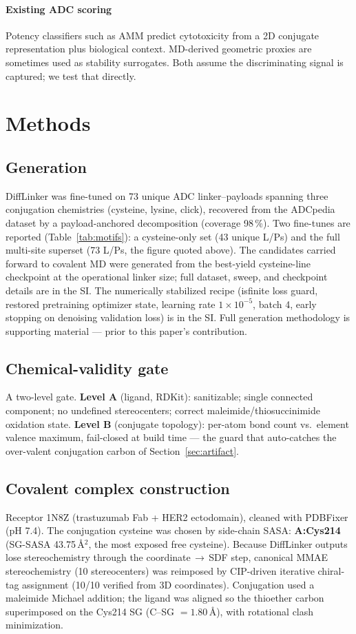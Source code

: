 \documentclass[10pt,twocolumn]{article}
\begin{document}
\paragraph{Existing ADC scoring}
Potency classifiers such as AMM predict cytotoxicity from a 2D conjugate representation plus biological
context.\cite{mslati2026} MD-derived geometric proxies are sometimes used as stability surrogates. Both
assume the discriminating signal is captured; we test that directly.

\section{Methods}

\subsection{Generation}
DiffLinker was fine-tuned on 73 unique ADC linker--payloads spanning three conjugation chemistries
(cysteine, lysine, click), recovered from the ADCpedia dataset\cite{mslati2026} by a payload-anchored
decomposition (coverage 98\,\%). Two fine-tunes are reported (Table~\ref{tab:motifs}): a cysteine-only
set (43 unique L/Ps) and the full multi-site superset (73 L/Ps, the figure quoted above). The candidates
carried forward to covalent MD were generated from the best-yield cysteine-line checkpoint at the
operational linker size; full dataset, sweep, and checkpoint details are in the SI. The numerically
stabilized recipe (isfinite loss guard, restored
pretraining optimizer state, learning rate $1\times10^{-5}$, batch 4, early stopping on denoising
validation loss) is in the SI. Full generation methodology is supporting material --- prior to this
paper's contribution.

\subsection{Chemical-validity gate}
A two-level gate. \textbf{Level A} (ligand, RDKit\cite{rdkit}): sanitizable; single connected component;
no undefined stereocenters; correct maleimide/thiosuccinimide oxidation state. \textbf{Level B}
(conjugate topology): per-atom bond count vs.\ element valence maximum, fail-closed at build time --- the
guard that auto-catches the over-valent conjugation carbon of Section~\ref{sec:artifact}.

\subsection{Covalent complex construction}
Receptor 1N8Z (trastuzumab Fab + HER2 ectodomain)\cite{cho2003}, cleaned with PDBFixer (pH 7.4). The
conjugation cysteine was chosen by side-chain SASA: \textbf{A:Cys214} (SG-SASA 43.75\,\AA$^2$, the most
exposed free cysteine). Because DiffLinker outputs lose stereochemistry through the
coordinate\,$\rightarrow$\,SDF step, canonical MMAE stereochemistry (10 stereocenters) was reimposed by
CIP-driven iterative chiral-tag assignment (10/10 verified from 3D coordinates). Conjugation used a
maleimide Michael addition; the ligand was aligned so the thioether carbon superimposed on the Cys214 SG
(C--SG $=1.80$\,\AA), with rotational clash minimization.
\end{document}
